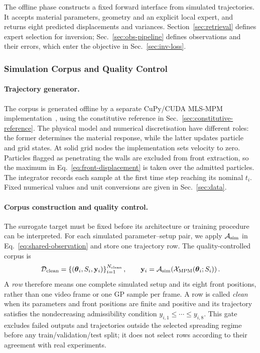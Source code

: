 The offline phase constructs a fixed forward interface from simulated
trajectories. It accepts material parameters, geometry and an explicit
local expert, and returns eight predicted displacements and variances.
Section~\ref{sec:retrieval} defines expert selection for inversion;
Sec.~\ref{sec:obs-pipeline} defines observations and their errors,
which enter the objective in Sec.~\ref{sec:inv-loss}.

\subsubsection{Simulation Corpus and Quality Control}

\label{sec:method-bank}


\paragraph{Trajectory generator.}
\label{sec:offline-simulator}
The corpus is generated offline by a separate CuPy/CUDA MLS-MPM
implementation~\cite{hu2018moving}, using the constitutive reference in
Sec.~\ref{sec:constitutive-reference}. The physical model and numerical
discretisation have different roles: the former determines the material
response, while the latter updates particle and grid states. At solid
grid nodes the implementation sets velocity to zero. Particles flagged
as penetrating the walls are excluded from front extraction, so the
maximum in Eq.~\eqref{eq:front-displacement} is taken over the admitted
particles. The integrator records each sample at the first time step
reaching its nominal $t_i$. Fixed numerical values and unit conversions
are given in Sec.~\ref{sec:data}.

\paragraph{Corpus construction and quality control.}

The surrogate target must be fixed before its architecture or training
procedure can be interpreted.  For each simulated parameter--setup pair,
we apply $\mathcal{A}_{\rm sim}$ in Eq.~\eqref{eq:shared-observation} and
store one trajectory row.  The quality-controlled corpus is
\begin{equation}
\label{eq:clean-corpus}
  \mathcal{D}_{\rm clean}
  =\left\{
  (\boldsymbol{\theta}_i,S_i,\mathbf{y}_i)
  \right\}_{i=1}^{N_{\rm clean}},
  \qquad
  \mathbf{y}_i=\mathcal{A}_{\rm sim}
  \!\left(\mathcal{X}_{\rm MPM}(\boldsymbol{\theta}_i;S_i)\right).
\end{equation}
A \emph{row} therefore means one complete simulated setup and its eight
front positions, rather than one video frame or one GP sample per frame.
A row is called \emph{clean} when its parameters and front positions are
finite and positive and its trajectory satisfies the nondecreasing
admissibility condition $y_{i,1}\leq\cdots\leq y_{i,8}$. This gate
excludes failed outputs and trajectories outside the selected spreading
regime before any
train/validation/test split; it does not select rows according to their
agreement with real experiments.

